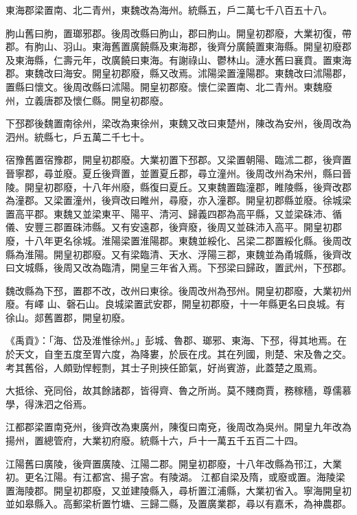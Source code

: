 \begin{pinyinscope}
 東海郡梁置南、北二青州，東魏改為海州。統縣五，戶二萬七千八百五十八。



 朐山舊曰朐，置瑯邪郡。後周改縣曰朐山，郡曰朐山。開皇初郡廢，大業初復，帶郡。有朐山、羽山。東海舊置廣饒縣及東海郡，後齊分廣饒置東海縣。開皇初廢郡及東海縣，仁壽元年，改廣饒曰東海。有謝祿山、鬱林山。漣水舊曰襄賁。置東海郡。東魏改曰海安。開皇初郡廢，縣又改焉。沭陽梁置潼陽郡。東魏改曰沭陽郡，置縣曰懷文。後周改縣曰沭陽。開皇初郡廢。懷仁梁置南、北二青州。東魏廢
 州，立義唐郡及懷仁縣。開皇初郡廢。



 下邳郡後魏置南徐州，梁改為東徐州，東魏又改曰東楚州，陳改為安州，後周改為泗州。統縣七，戶五萬二千七十。



 宿豫舊置宿豫郡，開皇初郡廢。大業初置下邳郡。又梁置朝陽、臨沭二郡，後齊置晉寧郡，尋並廢。夏丘後齊置，並置夏丘郡，尋立潼州。後周改州為宋州，縣曰晉陵。開皇初郡廢，十八年州廢，縣復曰夏丘。又東魏置臨潼郡，睢陵縣，後齊改郡為潼郡。又梁置潼州，後齊改曰睢州，尋廢，亦入潼郡。開皇初郡縣並廢。徐城梁置高平郡。東魏又並梁東平、陽平、清河、歸義四郡為高平縣，又並梁硃沛、循儀、安豐三郡置硃沛縣。又有安遠郡，後齊廢，後周又並硃沛入高平。開皇初郡廢，十八年更名徐城。淮陽梁置淮陽郡。東魏並綏化、呂梁二郡置綏化縣。後周改縣為淮陽。開皇初郡廢。又有梁臨清、天水、浮陽三郡，東魏並為甬城縣，後齊改曰文城縣，後周又改為臨清，開皇三年省入焉。下邳梁曰歸政，置武州，下邳郡。



 魏改縣為下邳，置郡不改，改州曰東徐。後周改州為邳州。開皇初郡廢，大業初州廢。有嶧
 山、磬石山。良城梁置武安郡，開皇初郡廢，十一年縣更名曰良城。有徐山。郯舊置郡，開皇初廢。



 《禹貢》：「海、岱及淮惟徐州。」彭城、魯郡、瑯邪、東海、下邳，得其地焉。在於天文，自奎五度至胃六度，為降婁，於辰在戌。其在列國，則楚、宋及魯之交。考其舊俗，人頗勁悍輕剽，其士子則挾任節氣，好尚賓游，此蓋楚之風焉。



 大抵徐、兗同俗，故其餘諸郡，皆得齊、魯之所尚。莫不賤商賈，務稼穡，尊儒慕學，得洙泗之俗焉。



 江都郡梁置南兗州，後齊改為東廣州，陳復曰南兗，後周改為吳州。開皇九年改為揚州，置總管府，大業初府廢。統縣十六，戶十一萬五千五百二十四。



 江陽舊曰廣陵，後齊置廣陵、江陽二郡。開皇初郡廢，十八年改縣為邗江，大業初。更名江陽。有江都宮、揚子宮。有陵湖。
 江都自梁及隋，或廢或置。海陵梁置海陵郡。開皇初郡廢，又並建陵縣入，尋析置江浦縣，大業初省入。寧海開皇初並如皋縣入。高郵梁析置竹塘、三歸二縣，及置廣業郡，尋以有嘉禾，為神農郡。




\end{pinyinscope}
